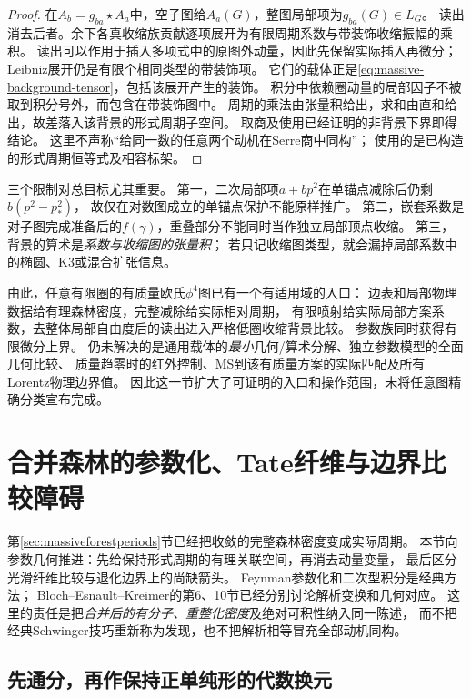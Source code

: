 \documentclass[11pt,a4paper]{ctexart}
\theoremstyle{cnplain}\newtheorem{theorem}{定理}[section]
\theoremstyle{definition}\newtheorem{definition}[theorem]{定义}
\theoremstyle{remark}\newtheorem{remark}[theorem]{注}
\begin{document}
\begin{proof}
在$A_b=g_{ba}\star A_a$中，空子图给$A_a(G)$，整图局部项为$g_{ba}(G)\in L_G$。
读出消去后者。余下各真收缩族贡献逐项展开为有限周期系数与带装饰收缩振幅的乘积。
读出可以作用于插入多项式中的原图外动量，因此先保留实际插入再微分；
Leibniz展开仍是有限个相同类型的带装饰项。
它们的载体正是\eqref{eq:massive-background-tensor}，包括该展开产生的装饰。
积分中依赖圈动量的局部因子不被取到积分号外，而包含在带装饰图中。
周期的乘法由张量积给出，求和由直和给出，故差落入该背景的形式周期子空间。
取商及使用已经证明的非背景下界即得结论。
这里不声称“给同一数的任意两个动机在Serre商中同构”；
使用的是已构造的形式周期恒等式及相容标架。
\end{proof}

三个限制对总目标尤其重要。
第一，二次局部项$a+b p^2$在单锚点减除后仍剩$b(p^2-p_*^2)$，
故仅在对数图成立的单锚点保护不能原样推广。
第二，嵌套系数是对子图完成准备后的$f(\gamma)$，重叠部分不能同时当作独立局部顶点收缩。
第三，背景的算术是\emph{系数与收缩图的张量积}；
若只记收缩图类型，就会漏掉局部系数中的椭圆、K3或混合扩张信息。

由此，任意有限圈的有质量欧氏$\phi^4$图已有一个有适用域的入口：
边表和局部物理数据给有理森林密度，完整减除给实际相对周期，
有限喷射给实际局部方案系数，去整体局部自由度后的读出进入严格低圈收缩背景比较。
参数族同时获得有限微分上界。
仍未解决的是通用载体的\emph{最小}几何/算术分解、独立参数模型的全面几何比较、
质量趋零时的红外控制、MS到该有质量方案的实际匹配及所有Lorentz物理边界值。
因此这一节扩大了可证明的入口和操作范围，未将任意图精确分类宣布完成。


\section{合并森林的参数化、Tate纤维与边界比较障碍}
\label{sec:forestparametric}

第\ref{sec:massiveforestperiods}节已经把收敛的完整森林密度变成实际周期。
本节向参数几何推进：先给保持形式周期的有理关联空间，再消去动量变量，
最后区分光滑纤维比较与退化边界上的尚缺箭头。
Feynman参数化和二次型积分是经典方法；
Bloch--Esnault--Kreimer的第6、10节已经分别讨论解析变换和几何对应\cite{BEKforest}。
这里的责任是把\emph{合并后的有分子、重整化密度}及绝对可积性纳入同一陈述，
而不把经典Schwinger技巧重新称为发现，也不把解析相等冒充全部动机同构。

\subsection{先通分，再作保持正单纯形的代数换元}
\end{document}
